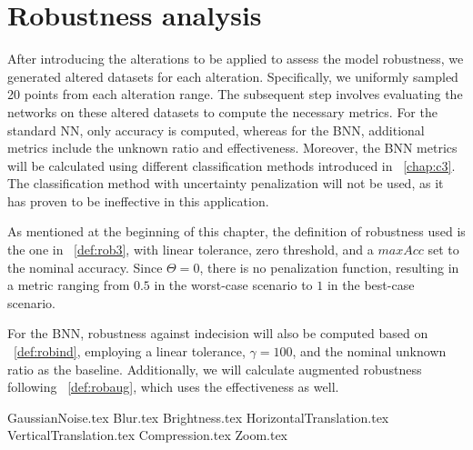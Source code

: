 \section{Robustness analysis}

After introducing the alterations to be applied to assess the model robustness, we generated altered datasets for each alteration. Specifically, we uniformly sampled 20 points from each alteration range. The subsequent step involves evaluating the networks on these altered datasets to compute the necessary metrics. For the standard NN, only accuracy is computed, whereas for the BNN, additional metrics include the unknown ratio and effectiveness. Moreover, the BNN metrics will be calculated using different classification methods introduced in \Chap~\ref{chap:c3}. The classification method with uncertainty penalization will not be used, as it has proven to be ineffective in this application.

As mentioned at the beginning of this chapter, the definition of robustness used is the one in \Def~\ref{def:rob3}, with linear tolerance, zero threshold, and a $maxAcc$ set to the nominal accuracy. Since $\Theta=0$, there is no penalization function, resulting in a metric ranging from $0.5$ in the worst-case scenario to $1$ in the best-case scenario.

For the BNN, robustness against indecision will also be computed based on \Def~\ref{def:robind}, employing a linear tolerance, $\gamma=100$, and the nominal unknown ratio as the baseline. Additionally, we will calculate augmented robustness following \Def~\ref{def:robaug}, which uses the effectiveness as well.

{GaussianNoise.tex}
{Blur.tex}
{Brightness.tex}
{HorizontalTranslation.tex}
{VerticalTranslation.tex}
{Compression.tex}
{Zoom.tex}